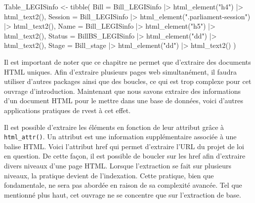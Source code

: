 \documentclass[
  letterpaper,
  DIV=11,
  numbers=noendperiod,
  oneside]{scrreprt}
\newenvironment{Shaded}{\begin{snugshade}}{\end{snugshade}}
\newcommand{\ErrorTok}[1]{\textcolor[rgb]{0.68,0.00,0.00}{#1}}
\newcommand{\ExtensionTok}[1]{\textcolor[rgb]{0.00,0.23,0.31}{#1}}
\newcommand{\FunctionTok}[1]{\textcolor[rgb]{0.28,0.35,0.67}{#1}}
\newcommand{\KeywordTok}[1]{\textcolor[rgb]{0.00,0.23,0.31}{#1}}
\newcommand{\NormalTok}[1]{\textcolor[rgb]{0.00,0.23,0.31}{#1}}
\newcommand{\OperatorTok}[1]{\textcolor[rgb]{0.37,0.37,0.37}{#1}}
\newcommand{\StringTok}[1]{\textcolor[rgb]{0.13,0.47,0.30}{#1}}
\begin{document}
\begin{Shaded}
\begin{Highlighting}[]
\ExtensionTok{Table\_LEGISinfo} \OperatorTok{\textless{}}\NormalTok{{-} tibble}\ErrorTok{(}
  \ExtensionTok{Bill}\NormalTok{ = Bill\_LEGISinfo }\KeywordTok{|}\OperatorTok{\textgreater{}}\NormalTok{ html\_element}\KeywordTok{(}\StringTok{"h4"}\KeywordTok{)} \KeywordTok{|}\OperatorTok{\textgreater{}}\NormalTok{ html\_text2}\KeywordTok{()}\ExtensionTok{,}
  \ExtensionTok{Session}\NormalTok{ = Bill\_LEGISinfo }\KeywordTok{|}\OperatorTok{\textgreater{}}\NormalTok{ html\_element}\KeywordTok{(}\StringTok{".parliament{-}session"}\KeywordTok{)} \KeywordTok{|}\OperatorTok{\textgreater{}}
  \FunctionTok{html\_text2()}\ExtensionTok{,}
  \ExtensionTok{Name}\NormalTok{ = Bill\_LEGISinfo }\KeywordTok{|}\OperatorTok{\textgreater{}}\NormalTok{ html\_element}\KeywordTok{(}\StringTok{"h5"}\KeywordTok{)} \KeywordTok{|}\OperatorTok{\textgreater{}}\NormalTok{ html\_text2}\KeywordTok{()}\ExtensionTok{,}
  \ExtensionTok{Status}\NormalTok{ = BillBS\_LEGISinfo }\KeywordTok{|}\OperatorTok{\textgreater{}}\NormalTok{ html\_element}\KeywordTok{(}\StringTok{"dd"}\KeywordTok{)} \KeywordTok{|}\OperatorTok{\textgreater{}}\NormalTok{ html\_text2}\KeywordTok{()}\ExtensionTok{,}
  \ExtensionTok{Stage}\NormalTok{ = Bill\_stage }\KeywordTok{|}\OperatorTok{\textgreater{}}\NormalTok{ html\_element}\KeywordTok{(}\StringTok{"dd"}\KeywordTok{)} \KeywordTok{|}\OperatorTok{\textgreater{}}\NormalTok{ html\_text2}\KeywordTok{()}
\KeywordTok{)}
\end{Highlighting}
\end{Shaded}

Il est important de noter que ce chapitre ne permet que d'extraire des
documents HTML uniques. Afin d'extraire plusieurs pages web
simultanément, il faudra utiliser d'autres packages ainsi que des
boucles, ce qui est trop complexe pour cet ouvrage d'introduction.
Maintenant que nous savons extraire des informations d'un document HTML
pour le mettre dans une base de données, voici d'autres applications
pratiques de rvest à cet effet.

Il est possible d'extraire les éléments en fonction de leur attribut
grâce à \texttt{html\_attr()}. Un attribut est une information
supplémentaire associée à une balise HTML. Voici l'attribut href qui
permet d'extraire l'URL du projet de loi en question. De cette façon, il
est possible de boucler sur les href afin d'extraire divers niveaux
d'une page HTML. Lorsque l'extraction se fait sur plusieurs niveaux, la
pratique devient de l'indexation. Cette pratique, bien que fondamentale,
ne sera pas abordée en raison de sa complexité avancée. Tel que
mentionné plus haut, cet ouvrage ne se concentre que sur l'extraction de
base.
\end{document}
